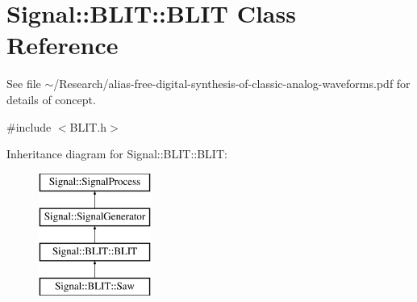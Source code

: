 \hypertarget{classSignal_1_1BLIT_1_1BLIT}{\section{Signal\+:\+:B\+L\+I\+T\+:\+:B\+L\+I\+T Class Reference}
\label{classSignal_1_1BLIT_1_1BLIT}
}


See file $\sim$/\+Research/alias-\/free-\/digital-\/synthesis-\/of-\/classic-\/analog-\/waveforms.pdf for details of concept.  




{\ttfamily \#include $<$B\+L\+I\+T.\+h$>$}

Inheritance diagram for Signal\+:\+:B\+L\+I\+T\+:\+:B\+L\+I\+T\+:\begin{figure}[H]
\begin{center}
\leavevmode
\includegraphics[height=4.000000cm]{classSignal_1_1BLIT_1_1BLIT}
\end{center}
\end{figure}

